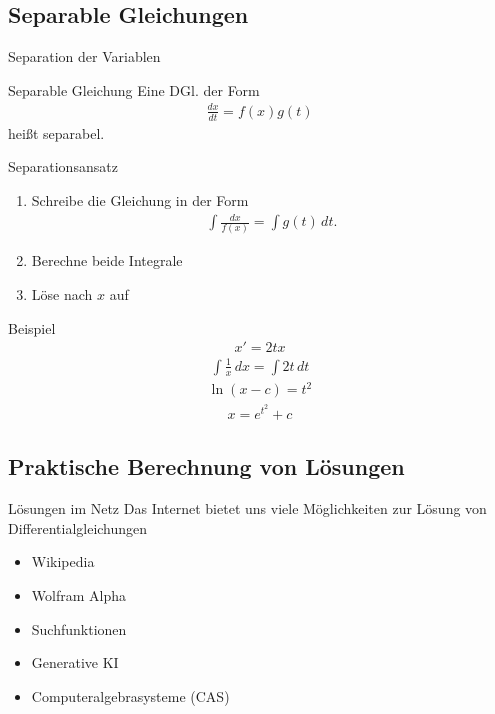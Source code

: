 \subsection{Separable Gleichungen}
\frame{\subtoc}

\begin{frame}{Separation der Variablen}
  \begin{block}{Separable Gleichung}
    Eine DGl. der Form
    \begin{gather*}
      \frac{dx}{dt} = f(x)g(t)
    \end{gather*}
    heißt separabel.
  \end{block}

  \pause
  \begin{block}{Separationsansatz}
    \begin{enumerate}
    \item Schreibe die Gleichung in der Form
      \begin{gather*}
        \int \frac{dx}{f(x)} = \int g(t) \,dt.
      \end{gather*}
    \item Berechne beide Integrale
    \item Löse nach $x$ auf
    \end{enumerate}
  \end{block}
\end{frame}

\begin{frame}{Beispiel}
  \begin{gather*}
    x' = 2tx
  \end{gather*}
  \pause
  \begin{gather*}
    \int \frac1x\,dx = \int 2t \,dt
  \end{gather*}
  \pause
  \begin{gather*}
    \ln(x-c) = t^2
  \end{gather*}
  \pause
  \begin{gather*}
    x = e^{t^2}+c
  \end{gather*}
\end{frame}

\subsection{Praktische Berechnung von Lösungen}
\frame{\subtoc}

\begin{frame}{Lösungen im Netz}
  Das Internet bietet uns viele Möglichkeiten zur Lösung von
  Differentialgleichungen
  \begin{itemize}
  \item Wikipedia
  \item Wolfram Alpha
  \item Suchfunktionen
  \item Generative KI
  \item Computeralgebrasysteme (CAS)
  \end{itemize}
\end{frame}

